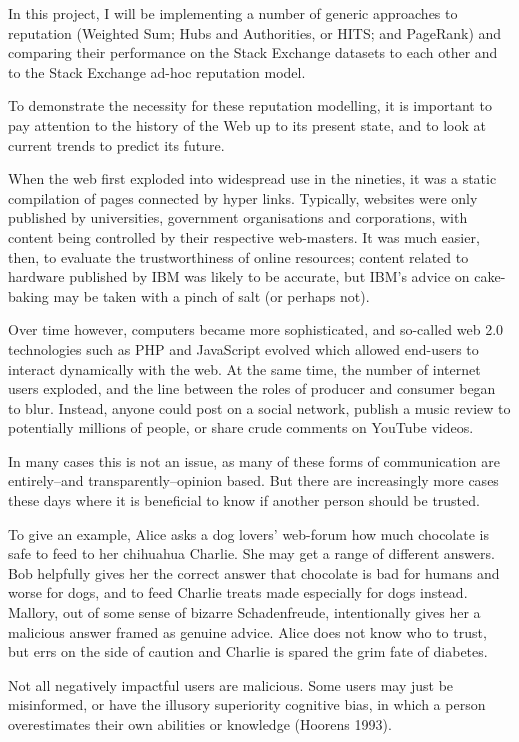 \documentclass[]{final_report}
\begin{document}
In this project, I will be implementing a number of generic approaches to reputation (Weighted Sum; Hubs and Authorities, or HITS; and PageRank) and comparing their performance on the Stack Exchange datasets to each other and to the Stack Exchange ad-hoc reputation model.

To demonstrate the necessity for these reputation modelling, it is important to pay attention to the history of the Web up to its present state, and to look at current trends to predict its future.

When the web first exploded into widespread use in the nineties, it was a static compilation of pages connected by hyper links. Typically, websites were only published by universities, government organisations and corporations, with content being controlled by their respective web-masters. It was much easier, then, to evaluate the trustworthiness of online resources; content related to hardware published by IBM was likely to be accurate, but IBM's advice on cake-baking may be taken with a pinch of salt (or perhaps not).

Over time however, computers became more sophisticated, and so-called web 2.0 technologies such as PHP and JavaScript evolved which allowed end-users to interact dynamically with the web. At the same time, the number of internet users exploded, and the line between the roles of producer and consumer began to blur. Instead, anyone could post on a social network, publish a music review to potentially millions of people, or share crude comments on YouTube videos.

In many cases this is not an issue, as many of these forms of communication are entirely--and transparently--opinion based. But there are increasingly more cases these days where it is beneficial to know if another person should be trusted.

To give an example, Alice asks a dog lovers' web-forum how much chocolate is safe to feed to her chihuahua Charlie. She may get a range of different answers. Bob helpfully gives her the correct answer that chocolate is bad for humans and worse for dogs, and to feed Charlie treats made especially for dogs instead. Mallory, out of some sense of bizarre Schadenfreude, intentionally gives her a malicious answer framed as genuine advice. Alice does not know who to trust, but errs on the side of caution and Charlie is spared the grim fate of diabetes.

Not all negatively impactful users are malicious. Some users may just be misinformed, or have the illusory superiority cognitive bias, in which a person overestimates their own abilities or knowledge (Hoorens 1993).
\end{document}
